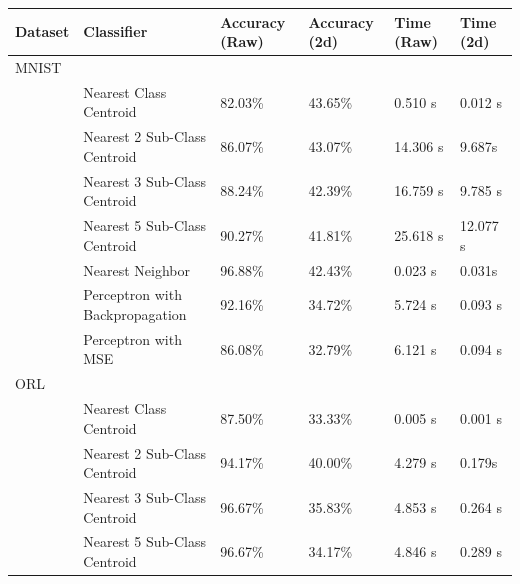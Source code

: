 \begin{table}[!htbp]
    \centering
    \begin{tabular}{|l|l|l|l|l|l|} 
    \hline
    Dataset & Classifier                      & Accuracy (Raw)       & Accuracy (2d)        & Time (Raw)           & Time (2d)  \\ 
    \hline
    MNIST   & \multicolumn{1}{l}{}            & \multicolumn{1}{l}{} & \multicolumn{1}{l}{} & \multicolumn{1}{l}{} &            \\ 
    \hline
            & Nearest Class Centroid          & 82.03\%              & 43.65\%              & 0.510 s              & 0.012 s    \\ 
    \cline{2-6}
            & Nearest 2 Sub-Class Centroid    & 86.07\%              & 43.07\%              & 14.306 s             & 9.687s    \\ 
    \cline{2-6}
            & Nearest 3 Sub-Class Centroid    & 88.24\%              & 42.39\%              & 16.759 s             & 9.785 s    \\ 
    \cline{2-6}
            & Nearest 5 Sub-Class Centroid    & 90.27\%              & 41.81\%              & 25.618 s             & 12.077 s    \\ 
    \cline{2-6}
            & Nearest Neighbor                & 96.88\%              & 42.43\%              & 0.023 s             & 0.031s    \\ 
    \cline{2-6}
            & Perceptron with Backpropagation & 92.16\%              & 34.72\%              & 5.724 s              & 0.093 s    \\ 
    \cline{2-6}
            & Perceptron with MSE             & 86.08\%              & 32.79\%              & 6.121 s              & 0.094 s    \\ 
    \hline
    ORL     & \multicolumn{1}{l}{}            & \multicolumn{1}{l}{} & \multicolumn{1}{l}{} & \multicolumn{1}{l}{} &            \\ 
    \hline
            & Nearest Class Centroid          & 87.50\%              & 33.33\%              & 0.005 s              & 0.001 s    \\ 
    \cline{2-6}
            & Nearest 2 Sub-Class Centroid    & 94.17\%              & 40.00\%              & 4.279 s              & 0.179s    \\ 
    \cline{2-6}
            & Nearest 3 Sub-Class Centroid    & 96.67\%              & 35.83\%              & 4.853 s              & 0.264 s    \\ 
    \cline{2-6}
            & Nearest 5 Sub-Class Centroid    & 96.67\%              & 34.17\%              & 4.846 s              & 0.289 s    \\ 

\end{tabular}
\end{table}
